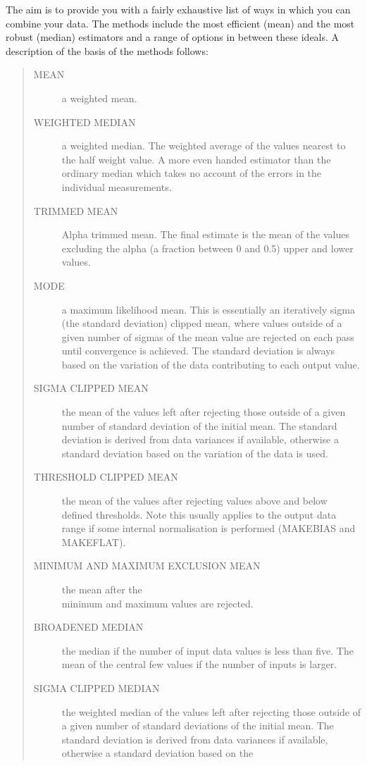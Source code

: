 \documentclass[twoside,11pt]{article}
\newcommand{\htmlref}[2]{#1}
\renewcommand{\_}{\texttt{\symbol{95}}}
\newenvironment{myquote}{\begin{quote}\begin{small}}{\end{small}\end{quote}}
\newcommand{\xroutine}[1]{\htmlref{{\sc #1}}{#1}}
\begin{document}
The aim is to provide you with a fairly exhaustive list of ways in which
you can combine your data. The methods include the most efficient
(mean) and the most robust (median) estimators and a range of options
in between these ideals. A description of the basis of the methods
follows:
\begin{myquote}
\begin{description}
\item[MEAN] a weighted mean.
\item[WEIGHTED MEDIAN] a weighted median. The weighted average of the
values nearest to the half weight value. A more even handed estimator
than the ordinary median which takes no account of the errors in the
individual measurements.
\item[TRIMMED MEAN] Alpha trimmed mean. The final estimate is the mean of the
values excluding the alpha (a fraction between 0 and 0.5) upper and lower
values.
\item[MODE] a maximum likelihood mean. This is essentially an
iteratively sigma (the standard deviation) clipped mean, where values
outside of a given number of sigmas of the mean value are rejected on
each pass until convergence is achieved. The standard deviation is always
based on the variation of the data contributing to each output value.
\item[SIGMA CLIPPED MEAN]  the mean of the values left after rejecting those
outside of a given number of standard deviation of the initial mean. The
standard deviation is derived from data variances if available, otherwise
a standard deviation based on the variation of the data is used.
\item[THRESHOLD CLIPPED MEAN] the mean of the values after rejecting
values above and below defined thresholds. Note this usually applies to
the output data range if some internal normalisation is performed
(\xroutine{MAKEBIAS} and
\xroutine{MAKEFLAT}).
\item[MINIMUM AND MAXIMUM EXCLUSION MEAN] the mean after the \\ minimum and
maximum values are rejected.
\item[BROADENED MEDIAN] the median if the number of input data values is
less than five. The mean of the central few values if the number of inputs is
larger.
\item[SIGMA CLIPPED MEDIAN]  the weighted median of the values left
after rejecting those outside of a given number of standard deviations
of the initial mean. The standard deviation is derived from data
variances if available, otherwise a standard deviation based on the

\end{description}
\end{myquote}
\end{document}
